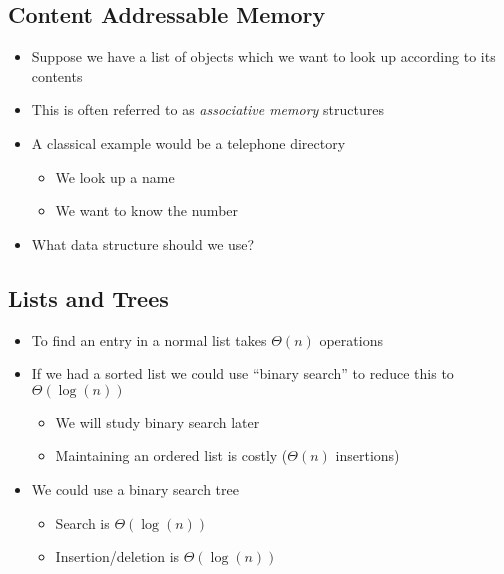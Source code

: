 \begin{slide}
\section{Content Addressable Memory}

\begin{PauseHighLight}
  \begin{itemize}
  \item Suppose we have a list of objects which we want to look up
    according to its contents\pause
  \item This is often referred to as \emph{associative memory}
    structures\pause
  \item A classical example would be a telephone directory\pause
    \begin{itemize}
    \item We look up a name
    \item We want to know the number\pause
    \end{itemize}
  \item What data structure should we use?\pause
  \end{itemize}
\end{PauseHighLight}

\end{slide}


\begin{slide}
\section{Lists and Trees}

\begin{PauseHighLight}
  \begin{itemize}
  \item To find an entry in a normal list takes $\Theta(n)$
    operations\pause 
  \item If we had a sorted list we could use ``binary search'' to reduce
    this to $\Theta(\log(n))$\pause
    \begin{itemize}
    \item We will study binary search later\pause
    \item Maintaining an ordered list is costly ($\Theta(n)$ insertions)\pause
    \end{itemize}
  \item We could use a binary search tree\pause
    \begin{itemize}
    \item Search is $\Theta(\log(n))$\pause
    \item Insertion/deletion is $\Theta(\log(n))$\pause
    \end{itemize}
  \end{itemize}
\end{PauseHighLight}

\end{slide}

